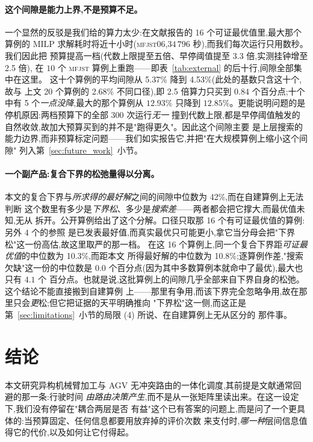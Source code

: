 \documentclass[manuscript,screen,review]{acmart}
\newcommand{\LBGapMed}{42\%}
\newcommand{\PubNInst}{20}
\newcommand{\PubNOpt}{16}                 %
\newcommand{\PubGapMean}{2.68\%}          %
\newcommand{\PubBudgetRatio}{2.5}
\newcommand{\PubGapLoBudget}{5.37\%}      %
\newcommand{\PubGapHiBudget}{4.53\%}      %
\newcommand{\PubBudgetGainPP}{0.84}       %
\newcommand{\PubBudgetNoGain}{5}          %
\newcommand{\PubLBSlack}{10.3\%}          %
\newcommand{\PubLBTotal}{10.8\%}          %
\newcommand{\PubLBResidMed}{0.0}          %
\newcommand{\PubLBResidMax}{4.1}          %
\begin{document}
\paragraph{这个间隙是能力上界,不是预算不足。}
一个显然的反驳是我们给的算力太少:在文献报告的 \PubNOpt{} 个可证最优值里,最大那个算例的
MILP 求解耗时将近十小时(\textsc{mfjst}06,$34\,796$ 秒),而我们每次运行只用数秒。我们因此把
预算提高一档(代数上限提至五倍、早停阈值提至 $3.3$ 倍,实测挂钟增至 \PubBudgetRatio{} 倍),
在 $10$ 个 \textsc{mfjst} 算例上重跑——即表~\ref{tab:external} 的后十行,间隙全部集中在这里。
这十个算例的平均间隙从 \PubGapLoBudget{} 降到 \PubGapHiBudget{}(此处的基数只含这十个,故与
上文 \PubNInst{} 个算例的 \PubGapMean{} 不同口径),即 \PubBudgetRatio{} 倍算力只买到
$\PubBudgetGainPP$ 个百分点;十个中有 \PubBudgetNoGain{} 个\emph{一点没降},最大的那个算例从
$12.93\%$ 只降到 $12.85\%$。更能说明问题的是停机原因:两档预算下的全部 $300$ 次运行\emph{无一}
撞到代数上限,都是早停阈值触发的自然收敛,故加大预算买到的并不是"跑得更久"。因此这个间隙主要
是上层搜索的能力边界,而非预算标定问题——我们如实报告它,并把"在大规模算例上缩小这个间隙"
列入第~\ref{sec:future_work}~小节。

\paragraph{一个副产品:复合下界的松弛量得以分离。}
本文的复合下界与\emph{所求得的最好解}之间的间隙中位数为 \LBGapMed{},而在自建算例上无法判断
这个数里有多少是\emph{下界松}、多少是\emph{搜索差}——两者都会把它撑大,而最优值未知,无从
拆开。公开算例给出了这个分解。口径只取那 \PubNOpt{} 个有可证最优值的算例:另外 $4$ 个的参照
是已发表最好值,而真实最优只可能更小,拿它当分母会把"下界松"这一份高估,故这里取严的那一档。
在这 \PubNOpt{} 个算例上,同一个复合下界距\emph{可证最优值}的中位数为 \PubLBSlack{},而距本文
所得最好解的中位数为 \PubLBTotal{};逐算例作差,"搜索欠缺"这一份的中位数是
$\PubLBResidMed$ 个百分点(因为其中多数算例本就命中了最优),最大也只有 $\PubLBResidMax$ 个
百分点。也就是说,这批算例上的间隙几乎全部来自下界自身的松弛。这个结论不能直接搬到自建算例
上——那里有争用,而该下界完全忽略争用,故在那里只会\emph{更}松;但它把证据的天平明确推向
"下界松"这一侧,而这正是第~\ref{sec:limitations}~小节的局限 (4) 所说、在自建算例上无从区分的
那件事。

\section{结论}
\label{sec:Chapter_VI}

本文研究异构机械臂加工与 AGV 无冲突路由的一体化调度,其前提是文献通常回避的那一条:行驶时间
\emph{由路由决策产生},而不是从一张矩阵里读出来。在这一设定下,我们没有停留在"耦合两层是否
有益"这个已有答案的问题上,而是问了一个更具体的:当预算固定、任何信息都要用放弃掉的评价次数
来支付时,\emph{哪一种}层间信息值得它的代价,以及如何让它付得起。
\end{document}
